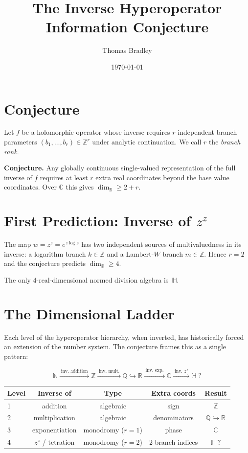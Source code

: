 \documentclass[11pt]{article}
\title{The Inverse Hyperoperator Information Conjecture}
\author{Thomas Bradley}
\date{\today}
\begin{document}
\maketitle

\section{Conjecture}

Let $f$ be a holomorphic operator whose inverse requires $r$ independent
branch parameters $(b_1,\dots,b_r)\in\mathbb{Z}^r$ under analytic
continuation. We call $r$ the \emph{branch rank}.

\medskip
\noindent\textbf{Conjecture.}\;
Any globally continuous single-valued representation of the full inverse
of $f$ requires at least $r$ extra real coordinates beyond the base value
coordinates. Over $\mathbb{C}$ this gives
$\dim_{\mathbb{R}} \geq 2 + r$.

\section{First Prediction: Inverse of $z^z$}

The map $w = z^z = e^{z\log z}$ has two independent sources of
multivaluedness in its inverse: a logarithm branch $k\in\mathbb{Z}$
and a Lambert-$W$ branch $m\in\mathbb{Z}$. Hence $r=2$ and the
conjecture predicts $\dim_{\mathbb{R}} \geq 4$.

The only 4-real-dimensional normed division algebra is~$\mathbb{H}$.

\section{The Dimensional Ladder}

Each level of the hyperoperator hierarchy, when inverted, has
historically forced an extension of the number system. The conjecture
frames this as a single pattern:

\[
\mathbb{N}
  \xrightarrow{\;\text{inv.\ addition}\;}
\mathbb{Z}
  \xrightarrow{\;\text{inv.\ mult.}\;}
\mathbb{Q}
  \hookrightarrow \mathbb{R}
  \xrightarrow{\;\text{inv.\ exp.}\;}
\mathbb{C}
  \xrightarrow{\;\text{inv.\ }z^z\;}
\mathbb{H}\;?
\]

\begin{center}
\begin{tabular}{lcccc}
\toprule
Level & Inverse of & Type & Extra coords & Result \\
\midrule
1 & addition        & algebraic & sign             & $\mathbb{Z}$ \\
2 & multiplication  & algebraic & denominators     & $\mathbb{Q}\hookrightarrow\mathbb{R}$ \\
3 & exponentiation  & monodromy ($r\!=\!1$) & phase  & $\mathbb{C}$ \\
4 & $z^z$ / tetration & monodromy ($r\!=\!2$) & 2 branch indices & $\mathbb{H}\;?$ \\
\bottomrule
\end{tabular}
\end{center}
\end{document}

